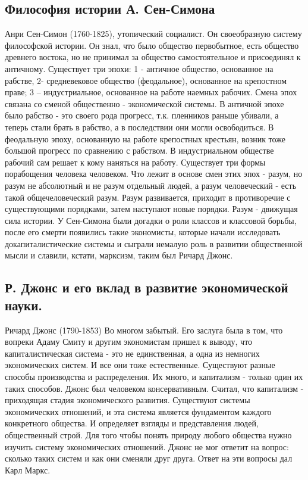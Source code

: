 \subsection{Философия истории А. Сен-Симона}

Анри Сен-Симон (1760-1825), утопический социалист. Он своеобразную систему философской истории. Он знал, что было общество первобытное, есть общество древнего востока, но не принимал за общество самостоятельное и присоединял к античному. Существует три эпохи: 1 - античное общество, основанное на рабстве, 2- средневековое общество (феодальное), основанное на крепостном праве; 3 – индустриальное, основанное на работе наемных рабочих. Смена эпох связана со сменой общественно - экономической системы. В античной эпохе было рабство - это своего рода прогресс, т.к. пленников раньше убивали, а теперь стали брать в рабство, а в последствии они могли освободиться. В феодальную эпоху, основанную на работе крепостных крестьян, возник тоже большой прогресс по сравнению с рабством. В индустриальном обществе рабочий сам решает к кому наняться на работу. Существует три формы порабощения человека человеком. Что лежит в основе смен этих эпох - разум, но разум не абсолютный и не разум отдельный людей, а разум человеческий - есть такой общечеловеческий разум. Разум развивается, приходит в противоречие с существующими порядками, затем наступают новые порядки. Разум - движущая сила истории. У Сен-Симона были догадки о роли классов и классовой борьбы, после его смерти появились такие экономисты, которые начали исследовать докапиталистические системы и сыграли немалую роль в развитии общественной мысли и славили, кстати, марксизм, таким был Ричард Джонс.
\subsection{Р. Джонс и его вклад в развитие экономической науки.}

Ричард Джонс (1790-1853) Во многом забытый. Его заслуга была в том, что вопреки Адаму Смиту и другим экономистам пришел к выводу, что капиталистическая система - это не единственная, а одна из немногих экономических систем. И все они тоже естественные. Существуют разные способы производства и распределения. Их много, и капитализм - только один их таких способов. Джонс был человеком консервативным. Считал, что капитализм - приходящая стадия экономического развития. Существуют системы экономических отношений, и эта система является фундаментом каждого конкретного общества. И определяет взгляды и представления людей, общественный строй. Для того чтобы понять природу любого общества нужно изучить систему экономических отношений. Джонс не мог ответит на вопрос: сколько таких систем и как они сменяли друг друга. Ответ на эти вопросы дал Карл Маркс.
